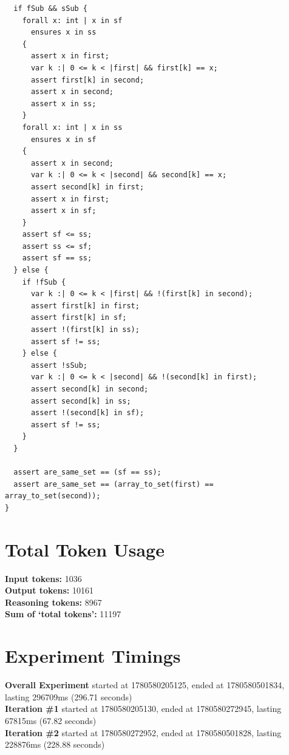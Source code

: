 \documentclass{article}
\begin{document}
\begin{lstlisting}
  if fSub && sSub {
    forall x: int | x in sf
      ensures x in ss
    {
      assert x in first;
      var k :| 0 <= k < |first| && first[k] == x;
      assert first[k] in second;
      assert x in second;
      assert x in ss;
    }
    forall x: int | x in ss
      ensures x in sf
    {
      assert x in second;
      var k :| 0 <= k < |second| && second[k] == x;
      assert second[k] in first;
      assert x in first;
      assert x in sf;
    }
    assert sf <= ss;
    assert ss <= sf;
    assert sf == ss;
  } else {
    if !fSub {
      var k :| 0 <= k < |first| && !(first[k] in second);
      assert first[k] in first;
      assert first[k] in sf;
      assert !(first[k] in ss);
      assert sf != ss;
    } else {
      assert !sSub;
      var k :| 0 <= k < |second| && !(second[k] in first);
      assert second[k] in second;
      assert second[k] in ss;
      assert !(second[k] in sf);
      assert sf != ss;
    }
  }

  assert are_same_set == (sf == ss);
  assert are_same_set == (array_to_set(first) == array_to_set(second));
}
\end{lstlisting}
\section*{Total Token Usage}
\textbf{Input tokens: }1036
\\\textbf{Output tokens: }10161
\\\textbf{Reasoning tokens: }8967
\\\textbf{Sum of `total tokens': }11197
\section*{Experiment Timings}
\textbf{Overall Experiment} started at 1780580205125, ended at 1780580501834, lasting 296709ms (296.71 seconds)
\\\textbf{Iteration \#1} started at 1780580205130, ended at 1780580272945, lasting 67815ms (67.82 seconds)
\\\textbf{Iteration \#2} started at 1780580272952, ended at 1780580501828, lasting 228876ms (228.88 seconds)
\end{document}
